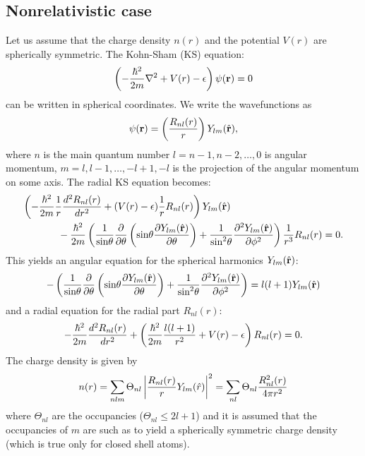 \documentclass[12pt,a4paper]{article}
\def\r{{\bf r}}
\begin{document}
\subsection{Nonrelativistic case}

Let us assume that the charge density $n(r)$ and the potential $V(r)$
are spherically symmetric. The Kohn-Sham (KS) equation:
\begin{equation}
\left(-{\hbar^2\over 2m}\nabla^2 + V(r)-\epsilon\right) \psi(\r)=0
\end{equation}
can be written in spherical coordinates. We write the wavefunctions as
\begin{equation}
\psi(\r)=\left({R_{nl}(r)\over r}\right)Y_{lm}(\hat\r),
\end{equation}
where $n$ is the main quantum 
number $l=n-1,n-2,\dots,0$ is angular momentum, $m=l,l-1,\dots,-l+1,-l$
is the projection of the angular momentum on some axis. 
The radial KS equation becomes:
\begin{eqnarray}
\left(-{\hbar^2\over 2m} {1\over r} {d^2 R_{nl}(r)\over dr^2}
      +(V(r)-\epsilon) {1\over r} R_{nl}(r)
\right) Y_{lm}(\hat\r) \hskip 4cm \nonumber \\ \mbox{} - 
{\hbar^2\over 2m} \left({1\over\mbox{sin}\theta}{\partial\over\partial\theta}
                        \left(\mbox{sin}\theta{\partial Y_{lm}(\hat\r)
                                               \over\partial\theta}\right)
                      + {1\over\mbox{sin}^2\theta}
                           {\partial^2Y_{lm}(\hat\r)\over\partial\phi^2}
                  \right) {1\over r^3} R_{nl}(r) = 0.
\end{eqnarray}
This yields an angular equation for the spherical harmonics $Y_{lm}(\hat\r)$:
\begin{equation}
-\left({1\over\mbox{sin}\theta}{\partial\over\partial\theta}
       \left(\mbox{sin}\theta{\partial Y_{lm}(\hat\r)\over\partial\theta}
       \right)
     + {1\over\mbox{sin}^2\theta}
                           {\partial^2Y_{lm}(\hat\r)\over\partial\phi^2}
\right) = l(l+1)Y_{lm}(\hat\r)
\end{equation}
and a radial equation for the radial part $R_{nl}(r)$:
\begin{equation}
-{\hbar^2\over 2m} {d^2 R_{nl}(r)\over dr^2}
+\left( {\hbar^2\over 2m} {l(l+1)\over r^2} + V(r)-\epsilon
\right) R_{nl}(r) = 0.
\end{equation}
The charge density is given by
\begin{equation}
n(r) = \sum_{nlm} \Theta_{nl}\left |{R_{nl}(r)\over r}Y_{lm}(\hat r)\right|^2 
     = \sum_{nl} \Theta_{nl}{R^2_{nl}(r)\over 4\pi r^2}
\end{equation}
where $\Theta_{nl}$ are the occupancies ($\Theta_{nl}\le 2l+1$)
and it is assumed that the occupancies of $m$ are such as to yield
a spherically symmetric charge density (which is true only for closed
shell atoms).
\end{document}
